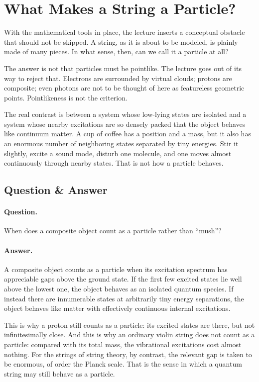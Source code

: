 \section{What Makes a String a Particle?}

With the mathematical tools in place, the lecture inserts a conceptual obstacle that should not be skipped. A string, as it is about to be modeled, is plainly made of many pieces. In what sense, then, can we call it a particle at all?

The answer is not that particles must be pointlike. The lecture goes out of its way to reject that. Electrons are surrounded by virtual clouds; protons are composite; even photons are not to be thought of here as featureless geometric points. Pointlikeness is not the criterion.

The real contrast is between a system whose low-lying states are isolated and a system whose nearby excitations are so densely packed that the object behaves like continuum matter. A cup of coffee has a position and a mass, but it also has an enormous number of neighboring states separated by tiny energies. Stir it slightly, excite a sound mode, disturb one molecule, and one moves almost continuously through nearby states. That is not how a particle behaves.

\subsection{Question \& Answer}

\paragraph{Question.}
When does a composite object count as a particle rather than ``mush''?

\paragraph{Answer.}
A composite object counts as a particle when its excitation spectrum has appreciable gaps above the ground state. If the first few excited states lie well above the lowest one, the object behaves as an isolated quantum species. If instead there are innumerable states at arbitrarily tiny energy separations, the object behaves like matter with effectively continuous internal excitations.

This is why a proton still counts as a particle: its excited states are there, but not infinitesimally close. And this is why an ordinary violin string does not count as a particle: compared with its total mass, the vibrational excitations cost almost nothing. For the strings of string theory, by contrast, the relevant gap is taken to be enormous, of order the Planck scale. That is the sense in which a quantum string may still behave as a particle.

